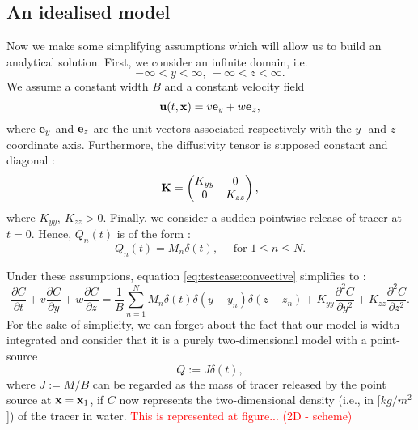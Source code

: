 \subsection*{An idealised model}
Now we make some simplifying assumptions which will allow us to build an analytical solution. First, we consider an infinite domain, i.e.
\begin{equation} \label{eq:testcase:domain}
	-\infty < y < \infty, \ -\infty < z < \infty.
\end{equation}
We assume a constant width $B$ and a constant velocity field
\begin{equation} \label{eq:testcase:velocity}
	\mathbf{u}(t,\mathbf{x}) = v \mathbf e_y + w \mathbf e_z,
\end{equation}
where $\mathbf e_y$ and $\mathbf e_z$ are the unit vectors associated respectively with the $y$- and $z$-coordinate axis. Furthermore, the diffusivity tensor is supposed constant and diagonal :
\begin{equation} \label{eq:testcase:diffusivity}
	\mathbf{K} = \begin{pmatrix}
			K_{yy} & 0 \\
			0 & K_{zz}
			\end{pmatrix},	
\end{equation}
where $K_{yy},\ K_{zz} > 0$. Finally, we consider a sudden pointwise release of tracer at $t=0$. Hence, $Q_n(t)$ is of the form :
\begin{equation}
	Q_n(t) = M_n\delta(t), \quad \mbox{ for } 1 \le n \le N.
\end{equation} 

Under these assumptions, equation \eqref{eq:testcase:convective} simplifies to :
\begin{equation} \label{eq:testcase}
	\frac{\partial C}{\partial t} + v \frac{\partial C}{\partial y} + w \frac{\partial C}{\partial z} = \frac{1}{B}\sum_{n=1}^N M_n \delta(t) \delta(y - y_n)\delta(z-z_n) + K_{yy} \frac{\partial^2 C}{\partial y^2} + K_{zz} \frac{\partial^2 C}{\partial z^2}.
\end{equation}
For the sake of simplicity, we can forget about the fact that our model is width-integrated and consider that it is a purely two-dimensional model with a point-source
\begin{equation}
	Q := J\delta(t),
\end{equation}
where $J := M/B$ can be regarded as the mass of tracer released by the point source at $\mathbf x = \mathbf x_1$, if $C$ now represents the two-dimensional density (i.e., in [$kg/m^2$]) of the tracer in water. \textcolor{red}{This is represented at figure... (2D - scheme)}

